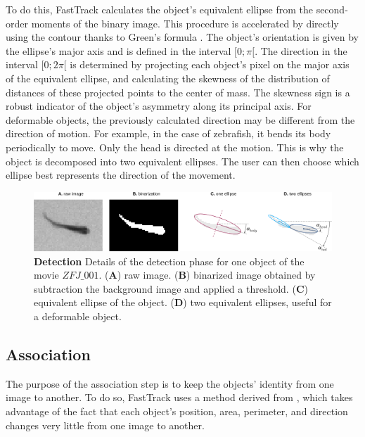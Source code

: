     To do this, FastTrack calculates the object's equivalent ellipse from the second-order moments of the binary image. This procedure is accelerated by directly using the contour thanks to Green's formula \cite{Riemann B.}. The object's orientation is given by the ellipse's major axis and is defined in the interval $[0;\pi[$. The direction in the interval $[0; 2\pi[ $ is determined by projecting each object's pixel on the major axis of the equivalent ellipse, and calculating the skewness of the distribution of distances of these projected points to the center of mass. The skewness sign is a robust indicator of the object's asymmetry along its principal axis.
    For deformable objects, the previously calculated direction may be different from the direction of motion. For example, in the case of zebrafish, it bends its body periodically to move. Only the head is directed at the motion. This is why the object is decomposed into two equivalent ellipses. The user can then choose which ellipse best represents the direction of the movement.

    \begin{figure}[h!]
    \centering
    \includegraphics[width=1\textwidth]{part_1/assets/Figure_ellipse.png}
    \caption{\textbf{Detection} Details of the detection phase for one object of the movie $ZFJ\_001$.
        (\textbf{A}) raw image.
        (\textbf{B}) binarized image obtained by subtraction the background image and applied a threshold.
        (\textbf{C}) equivalent ellipse of the object.
        (\textbf{D}) two equivalent ellipses, useful for a deformable object.}
    \label{part_1:fig_2}
    \end{figure}

    \subsection{Association}
    The purpose of the association step is to keep the objects' identity from one image to another. To do so, FastTrack uses a method derived from \cite{qian2016effective}, which takes advantage of the fact that each object's position, area, perimeter, and direction changes very little from one image to another.

